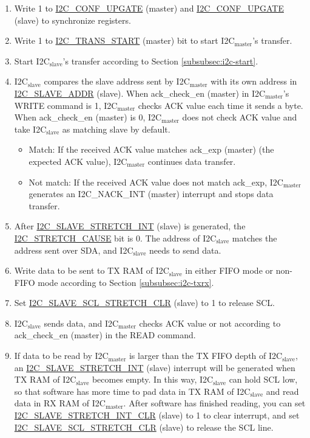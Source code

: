 \documentclass[main\_\_EN.tex]{subfiles}
\begin{document}
\begin{enumerate}
\item Write 1 to \hyperref[fielddesc:I2CCONFUPGATE]{I2C\_CONF\_UPGATE} (master) and \hyperref[fielddesc:I2CCONFUPGATE]{I2C\_CONF\_UPGATE} (slave) to synchronize registers.
\item Write 1 to \hyperref[fielddesc:I2CTRANSSTART]{I2C\_TRANS\_START} (master) bit to start I2C$_\text{master}$'s transfer.
\item Start I2C$_\text{slave}$'s transfer according to Section \ref{subsubsec:i2c-start}.
\item I2C$_\text{slave}$ compares the slave address sent by I2C$_\text{master}$ with its own address in \hyperref[fielddesc:I2CSLAVEADDR]{I2C\_SLAVE\_ADDR} (slave). When ack\_check\_en (master) in I2C$_\text{master}$'s WRITE command is 1, I2C$_\text{master}$ checks ACK value each time it sends a byte. When ack\_check\_en (master) is 0, I2C$_\text{master}$ does not check ACK value and take I2C$_\text{slave}$ as matching slave by default.
\begin{itemize}
\item Match: If the received ACK value matches ack\_exp (master) (the expected ACK value), I2C$_\text{master}$ continues data transfer.
\item Not match: If the received ACK value does not match ack\_exp, I2C$_\text{master}$ generates an I2C\_NACK\_INT (master) interrupt and stops data transfer.
\end{itemize}

\item After \hyperref[int:i2c-slave-stretch]{I2C\_SLAVE\_STRETCH\_INT} (slave) is generated, the \hyperref[fielddesc:I2CSTRETCHCAUSE]{I2C\_STRETCH\_CAUSE} bit is 0. The address of I2C$_\text{slave}$ matches the address sent over SDA, and I2C$_\text{slave}$ needs to send data.
\item Write data to be sent to TX RAM of I2C$_\text{slave}$ in either FIFO mode or non-FIFO mode according to Section \ref{subsubsec:i2c-txrx}.
\item Set \hyperref[fielddesc:I2CSLAVESCLSTRETCHCLR]{I2C\_SLAVE\_SCL\_STRETCH\_CLR} (slave) to 1 to release SCL.

\item I2C$_\text{slave}$ sends data, and I2C$_\text{master}$ checks ACK value or not according to ack\_check\_en (master) in the READ command.

\item If data to be read by I2C$_\text{master}$ is larger than the TX FIFO depth of I2C$_\text{slave}$, an \hyperref[int:i2c-slave-stretch]{I2C\_SLAVE\_STRETCH\_INT} (slave) interrupt will be generated when TX RAM of I2C$_\text{slave}$ becomes empty. In this way, I2C$_\text{slave}$ can hold SCL low, so that software has more time to pad data in TX RAM of I2C$_\text{slave}$ and read data in RX RAM of I2C$_\text{master}$. After software has finished reading, you can set \hyperref[fielddesc:I2CSLAVESTRETCHINTCLR]{I2C\_SLAVE\_STRETCH\_INT\_CLR} (slave) to 1 to clear interrupt, and set \hyperref[fielddesc:I2CSLAVESCLSTRETCHCLR]{I2C\_SLAVE\_SCL\_STRETCH\_CLR} (slave) to release the SCL line.


\end{enumerate}
\end{document}
